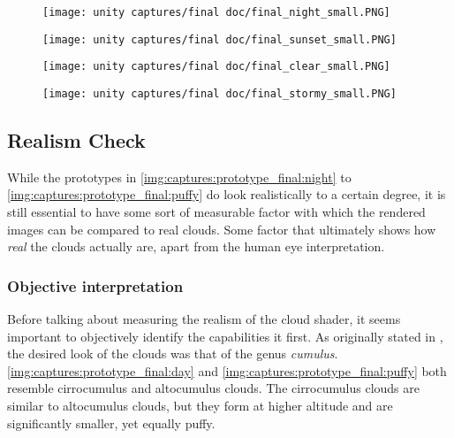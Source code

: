 \begin{figure}[H]
    \centering
        \begin{minipage}{0.47\linewidth}
            \texttt{[image: unity captures/final doc/final\_night\_small.PNG]}
            \label{img:captures:prototype_final:night}
        \end{minipage}
    \hfill
        \begin{minipage}{0.47\linewidth}
            \texttt{[image: unity captures/final doc/final\_sunset\_small.PNG]}
            \label{img:captures:prototype_final:sunset}
        \end{minipage}
\end{figure}

\begin{figure}[H]
    \centering
        \begin{minipage}{0.47\linewidth}
            \texttt{[image: unity captures/final doc/final\_clear\_small.PNG]}
            \label{img:captures:prototype_final:clear}
        \end{minipage}
    \hfill
        \begin{minipage}{0.47\linewidth}
            \texttt{[image: unity captures/final doc/final\_stormy\_small.PNG]}
            \label{img:captures:prototype_final:stormy}
        \end{minipage}
\end{figure}

\clearpage
\subsection{Realism Check}
While the prototypes in \autoref{img:captures:prototype_final:night} to \autoref{img:captures:prototype_final:puffy} do look realistically to a certain degree, it is still essential to have some sort of measurable factor with which the rendered images can be compared to real clouds.
Some factor that ultimately shows how \textit{real} the clouds actually are, apart from the human eye interpretation.

\subsubsection{Objective interpretation}
Before talking about measuring the realism of the cloud shader, it seems important to objectively identify the capabilities it first.
As originally stated in , the desired look of the clouds was that of the genus \textit{cumulus}.
\\
\autoref{img:captures:prototype_final:day} and \autoref{img:captures:prototype_final:puffy} both resemble cirrocumulus and altocumulus clouds.
The cirrocumulus clouds are similar to altocumulus clouds, but they form at higher altitude and are significantly smaller, yet equally puffy.

